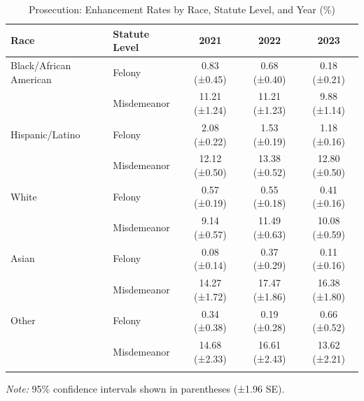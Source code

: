 \begin{table}[H]
\centering
\caption{Prosecution: Enhancement Rates by Race, Statute Level, and Year (\%)}
\label{tab:prosecution}
\begin{tabular}{l l c c c}
\toprule
Race & Statute Level & 2021 & 2022 & 2023 \\
\midrule
Black/African American & Felony & 0.83 ({\scriptsize ±0.45}) & 0.68 ({\scriptsize ±0.40}) & 0.18 ({\scriptsize ±0.21}) \\
 & Misdemeanor & 11.21 ({\scriptsize ±1.24}) & 11.21 ({\scriptsize ±1.23}) & 9.88 ({\scriptsize ±1.14}) \\
\addlinespace
Hispanic/Latino & Felony & 2.08 ({\scriptsize ±0.22}) & 1.53 ({\scriptsize ±0.19}) & 1.18 ({\scriptsize ±0.16}) \\
 & Misdemeanor & 12.12 ({\scriptsize ±0.50}) & 13.38 ({\scriptsize ±0.52}) & 12.80 ({\scriptsize ±0.50}) \\
\addlinespace
White & Felony & 0.57 ({\scriptsize ±0.19}) & 0.55 ({\scriptsize ±0.18}) & 0.41 ({\scriptsize ±0.16}) \\
 & Misdemeanor & 9.14 ({\scriptsize ±0.57}) & 11.49 ({\scriptsize ±0.63}) & 10.08 ({\scriptsize ±0.59}) \\
Asian & Felony & 0.08 ({\scriptsize ±0.14}) & 0.37 ({\scriptsize ±0.29}) & 0.11 ({\scriptsize ±0.16}) \\
 & Misdemeanor & 14.27 ({\scriptsize ±1.72}) & 17.47 ({\scriptsize ±1.86}) & 16.38 ({\scriptsize ±1.80}) \\
\addlinespace
Other & Felony & 0.34 ({\scriptsize ±0.38}) & 0.19 ({\scriptsize ±0.28}) & 0.66 ({\scriptsize ±0.52}) \\
 & Misdemeanor & 14.68 ({\scriptsize ±2.33}) & 16.61 ({\scriptsize ±2.43}) & 13.62 ({\scriptsize ±2.21}) \\
\addlinespace
\bottomrule
\end{tabular}
\smallskip
\parbox{\textwidth}{\footnotesize \textit{Note:} 95\% confidence intervals shown in parentheses (±1.96 SE).}
\end{table}


